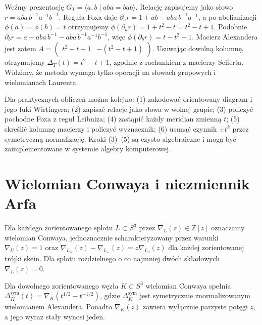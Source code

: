 \begin{przyklad}
Weźmy prezentację
$G_T=\langle a,b\mid aba=bab\rangle$.
Relację zapisujemy jako słowo
$r=aba\,b^{-1}a^{-1}b^{-1}$.
Reguła Foxa daje
$\partial_a r=1+ab-aba\,b^{-1}a^{-1}$,
a po abelianizacji $\phi(a)=\phi(b)=t$ otrzymujemy
$\phi(\partial_a r)=1+t^2-t=t^2-t+1$.
Podobnie
$\partial_b r=a-aba\,b^{-1}-aba\,b^{-1}a^{-1}b^{-1}$,
więc $\phi(\partial_b r)=t-t^2-1$.
Macierz Alexandera jest zatem
$A=\begin{pmatrix}t^2-t+1&-(t^2-t+1)\end{pmatrix}$.
Usuwając dowolną kolumnę, otrzymujemy
$\Delta_T(t)\doteq t^2-t+1$, zgodnie z rachunkiem
z macierzy Seiferta. Widzimy, że metoda wymaga tylko
operacji na słowach grupowych i wielomianach Laurenta.
\end{przyklad}

\begin{uwaga}
Dla praktycznych obliczeń można kolejno:
(1) zakodować orientowany diagram i jego łuki Wirtingera;
(2) zapisać relacje jako słowa w wolnej grupie;
(3) policzyć pochodne Foxa z reguł Leibniza;
(4) zastąpić każdy meridian zmienną $t$;
(5) skreślić kolumnę macierzy i policzyć wyznacznik;
(6) usunąć czynnik $\pm t^k$ przez symetryczną normalizację.
Kroki (3)--(5) są czysto algebraiczne i mogą być
zaimplementowane w systemie algebry komputerowej.
\end{uwaga}

\section{Wielomian Conwaya i niezmiennik Arfa}
\label{sec:kt-conway-arf}

\begin{definicja}
Dla każdego zorientowanego splotu $L\subset S^3$
przez $\nabla_L(z)\in\mathbb Z[z]$ oznaczamy
wielomian Conwaya, jednoznacznie scharakteryzowany
przez warunki $\nabla_U(z)=1$ oraz
$\nabla_{L_+}(z)-\nabla_{L_-}(z)=z\nabla_{L_0}(z)$
dla każdej zorientowanej trójki skein. Dla splotu
rozdzielnego o co najmniej dwóch składowych
$\nabla_L(z)=0$.
\end{definicja}

\begin{twierdzenie}
Dla dowolnego zorientowanego węzła $K\subset S^3$
wielomian Conwaya spełnia
$\Delta_K^{\mathrm{sym}}(t)=
\nabla_K(t^{1/2}-t^{-1/2})$,
gdzie $\Delta_K^{\mathrm{sym}}$ jest symetrycznie
znormalizowanym wielomianem Alexandera.
Ponadto $\nabla_K(z)$ zawiera wyłącznie parzyste
potęgi $z$, a jego wyraz stały wynosi jeden.
\end{twierdzenie}

